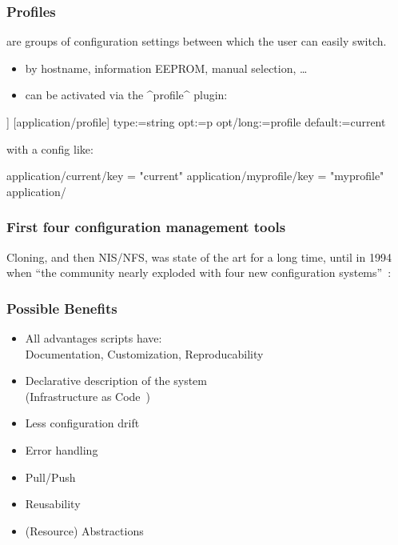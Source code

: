\begin{frame}[fragile]
	\frametitle{Profiles}

	 are groups of configuration settings between which the user can easily switch.

	\begin{itemize}
	\item by hostname, information EEPROM, manual selection, \dots
	\item can be activated via the ^profile^ plugin:
	\end{itemize}

	\begin{code}[morekeywords={long},gobble=4]]
	[application/profile]
	  type:=string
	  opt:=p
	  opt/long:=profile
	  default:=current
	\end{code}

	with a config like:
	\begin{code}[gobble=4,language=CfgElektra]
	application/current/key = "current"
	application/myprofile/key = "myprofile"
	application/%
	\end{code}
\end{frame}


\begin{frame}
	\frametitle{First four configuration management tools}
	Cloning, and then NIS/NFS, was state of the art for a long time, until in 1994 when \enquote{the community nearly exploded with four new configuration systems}~\cite{evard1997analysis}:

\end{frame}

\begin{frame}
	\frametitle{Possible Benefits}

	\begin{itemize}[<+-| alert@+>]
	\item All advantages scripts have: \\
		Documentation, Customization, Reproducability
	\item Declarative description of the system \\
		(Infrastructure as Code~\cite{waldemar2013testing})
	\item Less configuration drift
	\item Error handling
	\item Pull/Push
	\item Reusability
	\item (Resource) Abstractions
	\end{itemize}
\end{frame}


